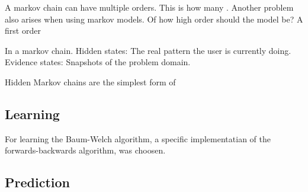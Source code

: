 A markov chain can have multiple orders. This is how many . Another problem also arises when using markov models. Of how high order should the model be? A first order 

 In a markov chain.
Hidden states: The real pattern the user is currently doing.
Evidence states: Snapshots of the problem domain.

Hidden Markov chains are the simplest form of

\subsection{Learning}
For learning the Baum-Welch algorithm, a specific implementatian of the forwards-backwards algorithm, was choosen.

\subsection{Prediction}
